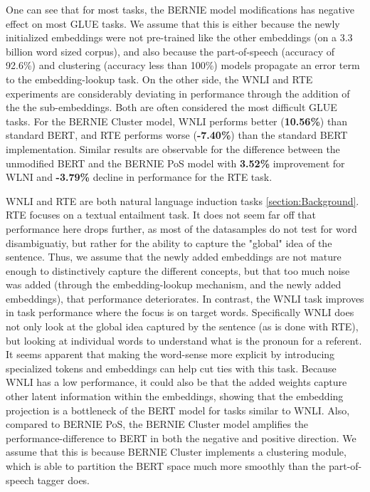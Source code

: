 \documentclass[a4paper,12pt,oneside,openright]{report}
\begin{document}
One can see that for most tasks, the BERNIE model modifications has negative effect on most GLUE tasks.
We assume that this is either because the newly initialized embeddings were not pre-trained like the other embeddings (on a 3.3 billion word sized corpus), and also because the part-of-speech (accuracy of 92.6\%) and clustering (accuracy less than 100\%) models propagate an error term to the embedding-lookup task.
On the other side, the WNLI and RTE experiments are considerably deviating in performance through the addition of the the sub-embeddings.
Both are often considered the most difficult GLUE tasks.
For the BERNIE Cluster model, WNLI performs better (\textbf{10.56\%}) than standard BERT, and RTE performs worse  (\textbf{-7.40\%}) than the standard BERT implementation.
Similar results are observable for the difference between the unmodified BERT and the BERNIE PoS model with \textbf{3.52\%} improvement for WLNI and \textbf{-3.79\%} decline in performance for the RTE task.

WNLI and RTE are both natural language induction tasks \ref{section:Background}.
RTE focuses on a textual entailment task. 
It does not seem far off that performance here drops further, as most of the datasamples do not test for word disambiguatiy, but rather for the ability to capture the "global" idea of the sentence.
Thus, we assume that the newly added embeddings are not mature enough to distinctively capture the different concepts, but that too much noise was added (through the embedding-lookup mechanism, and the newly added embeddings), that performance deteriorates.
In contrast, the WNLI task improves in task performance where the focus is on target words. 
Specifically WNLI does not only look at the global idea captured by the sentence (as is done with RTE), but looking at individual words to understand what is the pronoun for a referent.
It seems apparent that making the word-sense more explicit by introducing specialized tokens and embeddings can help cut ties with this task.
Because WNLI has a low performance, it could also be that the added weights capture other latent information within the embeddings, showing that the embedding projection is a bottleneck of the BERT model for tasks similar to WNLI.
Also, compared to BERNIE PoS, the BERNIE Cluster model amplifies the performance-difference to BERT in both the negative and positive direction.
We assume that this is because BERNIE Cluster implements a clustering module, which is able to partition the BERT space much more smoothly than the part-of-speech tagger does.
\end{document}
